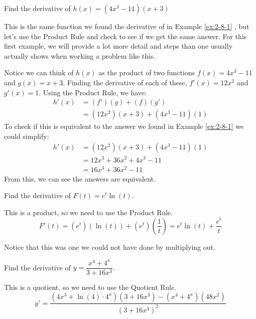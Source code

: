 \begin{example}
Find the derivative of $h(x)=(4x^3-11)(x+3)$

\begin{solution} This is the same function we found the derivative of in Example \ref{ex:2-8-1} , but let's use the Product Rule and check to see if we get the same answer. For this first example, we will provide a lot more detail and steps than one usually actually shows when working a problem like this.

Notice we can think of $h(x)$ as the product of two functions $f(x)=4x^3-11$ and $g(x)=x+3$. Finding the derivative of each of these,
$f'(x)=12x^2$ and $g'(x)=1$.
Using the Product Rule, we have: 
\begin{align*}
		h'(x) &= (f')(g)+(f)(g') \\
		 &= \left(12x^2\right)(x+3)+\left(4x^3-11\right)(1)
	\end{align*}
To check if this is equivalent to the answer we found in Example \ref{ex:2-8-1}  we could simplify:
\begin{align*}
		h'(x) &= \left(12x^2\right)(x+3)+\left(4x^3-11\right)(1) \\
		 &= 12x^3+36x^2+4x^3-11 \\
		 &= 16x^3+36x^2-11
	\end{align*}
From this, we can see the answers are equivalent.
\end{solution}\end{example}

\begin{example}
Find the derivative of $ F(t)=e^t\ln(t) $.

\begin{solution} This is a product, so we need to use the Product Rule. 
$$F'(t)=\left(e^t\right)\left(\ln(t)\right)+\left(e^t\right)\left(\dfrac{1}{t}\right)=e^t\ln(t)+\dfrac{e^t}{t}$$
\end{solution}\end{example}

Notice that this was one we could not have done by multiplying out.

\begin{example}
Find the derivative of $ y=\dfrac{x^4+4^x}{3+16x^3} $.

\begin{solution} This is a quotient, so we need to use the Quotient Rule.
$$y'=\dfrac{\left(4x^3+\ln(4)\cdot 4^x \right)\left(3+16x^3 \right)-\left(x^4+4^x \right)\left(48x^2 \right)}{\left(3+16x^3 \right)^2}$$
\end{solution}\end{example}

